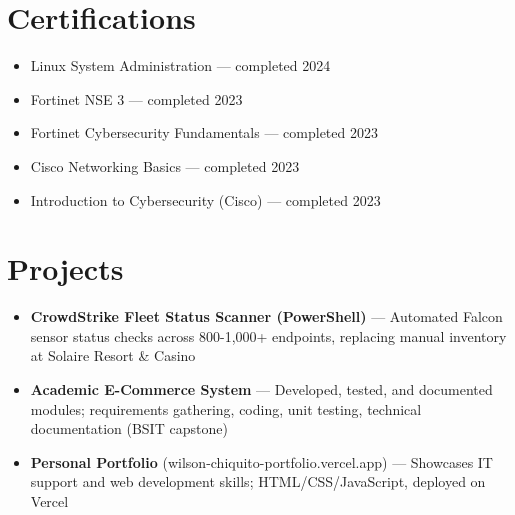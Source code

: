 \documentclass[11pt,a4paper,sans]{moderncv}
\begin{document}
\section{Certifications}
\vspace{1pt}
\begin{itemize}
\setlength{\itemsep}{1pt}
\setlength{\parsep}{0pt}

\item Linux System Administration — completed 2024
\item Fortinet NSE 3 — completed 2023
\item Fortinet Cybersecurity Fundamentals — completed 2023
\item Cisco Networking Basics — completed 2023
\item Introduction to Cybersecurity (Cisco) — completed 2023

\end{itemize}


\section{Projects}
\vspace{1pt}
\begin{itemize}
\setlength{\itemsep}{1pt}
\setlength{\parsep}{0pt}

\item \textbf{CrowdStrike Fleet Status Scanner (PowerShell)} — Automated Falcon sensor status checks across 800-1,000+ endpoints, replacing manual inventory at Solaire Resort \& Casino
\item \textbf{Academic E-Commerce System} — Developed, tested, and documented modules; requirements gathering, coding, unit testing, technical documentation (BSIT capstone)
\item \textbf{Personal Portfolio} (wilson-chiquito-portfolio.vercel.app) — Showcases IT support and web development skills; HTML/CSS/JavaScript, deployed on Vercel

\end{itemize}
\end{document}
